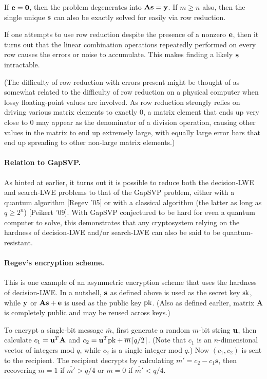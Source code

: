 If ${{\bf e}} = \textbf{0}$, then the problem degenerates into $\textbf{A}\mathbf{s} = 
{{\bf y}}$. If $m \ge n$ also, then the single unique $\mathbf{s}$ can also be exactly 
solved for easily via row reduction.

If one attempts to use row reduction despite the presence of a nonzero ${{\bf e}}$, 
then it turns out that the linear combination operations repeatedly performed on 
every row causes the errors or noise to accumulate. This makes finding a likely 
$\mathbf{s}$ intractable.

(The difficulty of row reduction with errors present might be thought of as 
somewhat related to the difficulty of row reduction on a physical computer when 
lossy floating-point values are involved. As row reduction strongly relies on 
driving various matrix elements to exactly 0, a matrix element that ends up very 
close to 0 may appear as the denominator of a division operation, causing other 
values in the matrix to end up extremely large, with equally large error bars 
that end up spreading to other non-large matrix elements.)

\paragraph{Relation to GapSVP.}
As hinted at earlier, it turns out it is possible to reduce both the 
decision-LWE and search-LWE problems to that of the GapSVP problem, either with 
a quantum algorithm [Regev '05] or with a classical algorithm (the latter as 
long as $q \ge 2^n$) [Peikert '09]. With GapSVP conjectured to be hard for even 
a quantum computer to solve, this demonstrates that any cryptosystem relying on 
the hardness of decision-LWE and/or search-LWE can also be said to be 
quantum-resistant.

\paragraph{Regev's encryption scheme.}
This is one example of an asymmetric encryption scheme that uses the hardness of 
decision-LWE. In a nutshell, $\mathbf{s}$ as defined above is used as the secret key 
$\textnormal{sk}$, while ${{\bf y}}$ or $\textbf{A}\mathbf{s} + {{\bf e}}$ is used as the 
public key $\textnormal{pk}$. (Also as defined earlier, matrix $\textbf{A}$ is 
completely public and may be reused across keys.)

To encrypt a single-bit message $\overline{m}$, first generate a random $m$-bit 
string $\mathbf{u}$, then calculate $c_1 = \mathbf{u}^T\textbf{A}$ and $c_2 = 
\mathbf{u}^T\textnormal{pk}+\overline{m}\lceil q/2 \rceil$. (Note that $c_1$ is an 
$n$-dimensional vector of integers mod $q$, while $c_2$ is a single integer mod 
$q$.) Now $(c_1, c_2)$ is sent to the recipient. The recipient decrypts by 
calculating $\overline{m'} = c_2 - c_1\textbf{s}$, then recovering $\overline{m} 
= 1$ if $\overline{m'} > q/4$ or $\overline{m} = 0$ if $\overline{m'} < q/4$.

